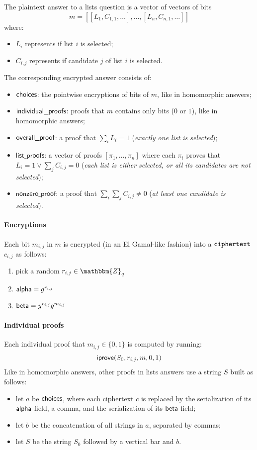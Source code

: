 \documentclass[a4paper]{article}
\newcommand{\Z}{\mathbbm{Z}}
\begin{document}
The plaintext answer to a lists question is a vector of vectors of
bits \[m=[[L_1,C_{1,1},\dots],\dots,[L_n,C_{n,1},\dots]]\] where:
\begin{itemize}
\item $L_i$ represents if list $i$ is selected;
\item $C_{i,j}$ represents if candidate $j$ of list $i$ is selected.
\end{itemize}
The corresponding encrypted answer consists of:
\begin{itemize}
\item $\textsf{choices}$: the pointwise encryptions of bits of $m$,
  like in homomorphic answers;
\item $\textsf{individual\_proofs}$: proofs that $m$ contains only bits ($0$ or $1$),
  like in homomorphic answers;
\item $\textsf{overall\_proof}$: a proof that $\sum_i L_i=1$ (\emph{exactly one list
    is selected});
\item $\textsf{list\_proofs}$: a vector of proofs
  $[\pi_1,\dots,\pi_n]$ where each $\pi_i$ proves that
  $L_i=1\lor\sum_jC_{i,j}=0$ (\emph{each list is either selected, or
    all its candidates are not selected});
\item $\textsf{nonzero\_proof}$: a proof that
  $\sum_i\sum_jC_{i,j}\neq 0$ (\emph{at least one candidate is
    selected}).
\end{itemize}

\paragraph{Encryptions} Each bit $m_{i,j}$ in $m$ is encrypted (in an
El Gamal-like fashion) into a $\texttt{ciphertext}$ $c_{i,j}$ as follows:
\begin{enumerate}
\item pick a random $r_{i,j}\in\Z_q$
\item $\textsf{alpha}=g^{r_{i,j}}$
\item $\textsf{beta}=y^{r_{i,j}}g^{m_{i,j}}$
\end{enumerate}
\paragraph{Individual proofs} Each individual proof that
$m_{i,j}\in\{0,1\}$ is computed by running:
\[\textsf{iprove}(S_0,r_{i,j},m,0,1)\]
Like in homomorphic answers, other proofs in lists answers use a
string $S$ built as follows:
\begin{itemize}
\item let $a$ be $\textsf{choices}$, where each ciphertext $c$ is replaced by
  the serialization of its $\textsf{alpha}$ field, a comma, and the
  serialization of its $\textsf{beta}$ field;
\item let $b$ be the concatenation of all strings in $a$, separated by
  commas;
\item let $S$ be the string $S_0$ followed by a vertical bar and $b$.
\end{itemize}
\end{document}
